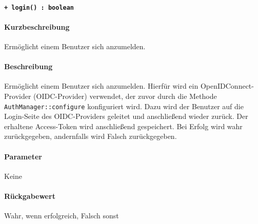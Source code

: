 \paragraph{\texttt{+ login() : boolean}}%
\paragraph*{Kurzbeschreibung}
Ermöglicht einem Benutzer sich anzumelden.
\paragraph*{Beschreibung}
Ermöglicht einem Benutzer sich anzumelden.
Hierfür wird ein OpenIDConnect-Provider (OIDC-Provider) verwendet, der zuvor durch die Methode \verb#AuthManager::configure# konfiguriert wird.
Dazu wird der Benutzer auf die Login-Seite des OIDC-Providers geleitet und anschließend wieder zurück.
Der erhaltene Access-Token wird anschließend gespeichert.
Bei Erfolg wird wahr zurückgegeben, andernfalls wird Falsch zurückgegeben.
\paragraph*{Parameter}
Keine
\paragraph*{Rückgabewert}
Wahr, wenn erfolgreich, Falsch sonst
